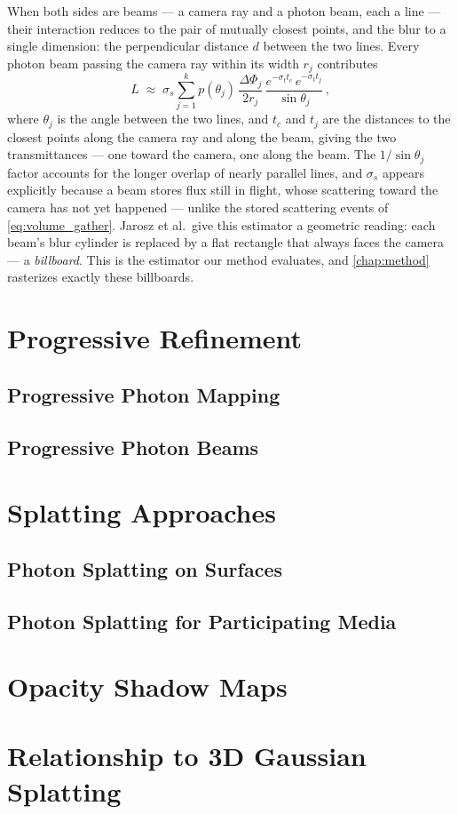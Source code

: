 When both sides are beams --- a camera ray and a photon beam, each a line --- their interaction reduces to the pair of mutually closest points, and the blur to a single dimension: the perpendicular distance $d$ between the two lines. Every photon beam passing the camera ray within its width $r_j$ contributes
\begin{equation}
	\label{eq:beam_beam_1d}
	L \;\approx\; \sigma_s \sum_{j=1}^{k} p(\theta_j) \, \frac{\Delta\Phi_j}{2 r_j} \, \frac{e^{-\sigma_t t_c} \, e^{-\sigma_t t_j}}{\sin\theta_j} \,,
\end{equation}
where $\theta_j$ is the angle between the two lines, and $t_c$ and $t_j$ are the distances to the closest points along the camera ray and along the beam, giving the two transmittances --- one toward the camera, one along the beam. The $1/\sin\theta_j$ factor accounts for the longer overlap of nearly parallel lines, and $\sigma_s$ appears explicitly because a beam stores flux still in flight, whose scattering toward the camera has not yet happened --- unlike the stored scattering events of \cref{eq:volume_gather}. Jarosz et al.\ give this estimator a geometric reading: each beam's blur cylinder is replaced by a flat rectangle that always faces the camera --- a \emph{billboard}. This is the estimator our method evaluates, and \cref{chap:method} rasterizes exactly these billboards.

\section{Progressive Refinement}
\subsection{Progressive Photon Mapping}
\subsection{Progressive Photon Beams}

\section{Splatting Approaches}
\subsection{Photon Splatting on Surfaces}
\subsection{Photon Splatting for Participating Media}

\section{Opacity Shadow Maps}

\section{Relationship to 3D Gaussian Splatting}
